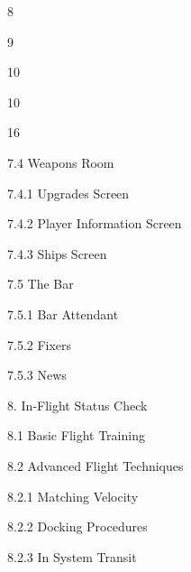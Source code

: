 \documentclass{article}
\begin{document}
8



9



10

10



16











































7.4 Weapons Room  



7.4.1 Upgrades Screen  



7.4.2 Player Information Screen  



7.4.3 Ships Screen 



7.5 The Bar 



7.5.1 Bar Attendant 



7.5.2 Fixers  



7.5.3 News

   8. In-Flight Status Check  



8.1 Basic Flight Training  



8.2 Advanced Flight Techniques   



8.2.1 Matching Velocity   



8.2.2 Docking Procedures 



8.2.3 In System Transit   
\end{document}

